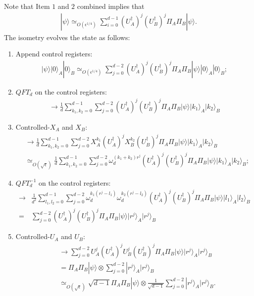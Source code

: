 \documentclass[11pt,letterpaper]{article}
\newcommand{\ket}[1]{|#1\rangle}
\newcommand{\x}{\otimes}
\newcommand{\ct}{^{\dagger}}
\newcommand{\1}{\mathbb{1}}
\newcommand{\appd}[1]{\simeq_{#1}}
\theoremstyle{definition}
\begin{document}
Note that Item $1$ and $2$ combined implies that
\begin{align}
	\ket{\psi} \appd{O(\epsilon^{1/4})} \sum_{i=0}^{d-1} (U_A\ct)^j (U_B\ct)^j\Pi_A \Pi_B \ket{\psi}.
\end{align}
The isometry evolves the state as follows:
\begin{enumerate}
	\item Append control registers:
	\begin{align}
		\ket{\psi} \ket{0}_A\ket{0}_B \appd{O(\epsilon^{1/4})} 
		\sum_{j=0}^{d-2} (U_A\ct)^j (U_B\ct)^j\Pi_A \Pi_B \ket{\psi} \ket{0}_A\ket{0}_B;
	\end{align}
	\item $QFT_d$ on the control registers:
	\begin{align}
		\to \frac{1}{d}\sum_{k_1,k_2 = 0}^{d-1} \sum_{j=0}^{d-2} (U_A\ct)^j (U_B\ct)^j\Pi_A \Pi_B \ket{\psi} \ket{k_1}_A\ket{k_2}_B
	\end{align}
	\item Controlled-$X_A$ and $X_B$:
	\begin{align}
		&\to \frac{1}{d}\sum_{k_1,k_2 = 0}^{d-1} \sum_{j=0}^{d-2} X_A^{k_1}(U_A\ct)^j X_B^{k_2}(U_B\ct)^j\Pi_A \Pi_B \ket{\psi} \ket{k_1}_A\ket{k_2}_B\\
		&\appd{O(\sqrt{\epsilon})}\frac{1}{d} \sum_{k_1,k_2 = 0}^{d-1} \sum_{j=0}^{d-2} \omega_d^{(k_1+k_2)r^j}(U_A\ct)^j(U_B\ct)^j\Pi_A \Pi_B \ket{\psi} \ket{k_1}_A\ket{k_2}_B;
	\end{align}
	\item $QFT_d^{-1}$ on the control registers:
	\begin{align}
		\to &\frac{1}{d^2}\sum_{l_1,l_2 = 0}^{d-1}\sum_{j=0}^{d-2} \omega_d^{k_1(r^j-l_1)}\omega_d^{k_2(r^j-l_2)} (U_A\ct)^j(U_B\ct)^j\Pi_A \Pi_B \ket{\psi} \ket{l_1}_A\ket{l_2}_B\\
		= &\sum_{j=0}^{d-2}(U_A\ct)^j(U_B\ct)^j\Pi_A \Pi_B \ket{\psi} \ket{r^j}_A\ket{r^j}_B
	\end{align}
	\item Controlled-$U_A$ and $U_B$:
	\begin{align}
		&\to \sum_{j=0}^{d-2} U_A^j (U_A\ct)^j U_B^j (U_B\ct)^j \Pi_A \Pi_B \ket{\psi} \ket{r^j}_A\ket{r^j}_B\\
		&= \Pi_A \Pi_B \ket{\psi} \x \sum_{j=0}^{d-2} \ket{r^j}_A\ket{r^j}_B\\
		&\appd{O(\sqrt{\epsilon})} \sqrt{d-1}\Pi_A \Pi_B \ket{\psi} \x \frac{1}{\sqrt{d-1}} \sum_{j=0}^{d-2} \ket{r^j}_A\ket{r^j}_B.
	\end{align}
\end{enumerate}
\end{document}

